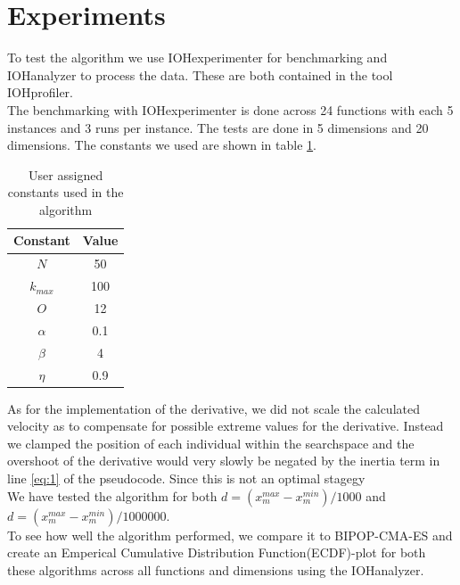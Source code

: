 \documentclass[runningheads]{llncs}
\begin{document}

\section{Experiments}
To test the algorithm we use IOHexperimenter for benchmarking and IOHanalyzer to process the data. These are both contained in the tool IOHprofiler\cite{IOHprofiler}.\\
The benchmarking with IOHexperimenter is done across 24 functions with each 5 instances and 3 runs per instance. The tests are done in 5 dimensions and 20 dimensions. The constants we used are shown in table \ref{tab:constants}.
\begin{table}[h!]
    \centering
    \begin{tabular}{c|c}
        Constant & Value \\ \hline \hline
        $N$ & 50\\\hline
        $k_{max}$ & 100\\\hline
        $O$ & 12 \\\hline
        $\alpha$ & 0.1 \\\hline
        $\beta$ & 4 \\\hline
        $\eta$ & 0.9
        \end{tabular}
    \caption{User assigned constants used in the algorithm}
    \label{tab:constants}
\end{table}{}

As for the implementation of the derivative, we did not scale the calculated velocity as to compensate for possible extreme values for the derivative. Instead we clamped the position of each individual within the searchspace and the overshoot of the derivative would very slowly be negated by the inertia term in line \ref{eq:1} of the pseudocode. Since this is not an optimal stagegy\\
We have tested the algorithm for both $d = (x_m^{max}-x_m^{min})/1000$ and $d = (x_m^{max}-x_m^{min})/1000000$.\\

To see how well the algorithm performed, we compare it to BIPOP-CMA-ES\cite{COCOperformace} and create an Emperical Cumulative Distribution Function(ECDF)-plot for both these algorithms across all functions and dimensions using the IOHanalyzer.
\end{document}
